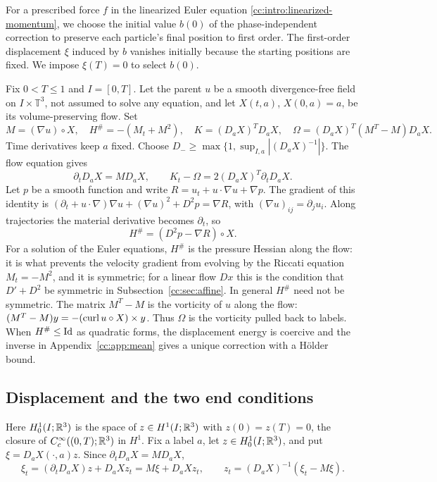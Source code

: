 For a prescribed force $f$ in the linearized Euler equation
\eqref{cc:intro:linearized-momentum}, we choose the initial value $b(0)$
of the phase-independent correction to preserve each particle's final
position to first order. The first-order displacement $\xi$ induced by
$b$ vanishes initially because the starting positions are fixed.
We impose $\xi(T)=0$ to select $b(0)$.

Fix $0<T\le1$ and $I=[0,T]$. Let the parent $u$ be a smooth
divergence-free field on $I\times\mathbb T^3$, not assumed to solve any
equation, and let $X(t,a)$, $X(0,a)=a$, be its volume-preserving flow. Set
\begin{equation}\label{cc:uf:mean:data}
 M=(\nabla u)\circ X,\quad
 H^\#=-(M_t+M^2),\quad
 K=(D_aX)^TD_aX,\quad \Omega=(D_aX)^T(M^T-M)D_aX.
\end{equation}
Time derivatives keep $a$ fixed. Choose
$D_-\ge\max\{1,\sup_{I,a}|(D_aX)^{-1}|\}$.
The flow equation gives
\begin{equation}\label{cc:uf:mean:flow-identities}
 \partial_t D_aX=MD_aX,\qquad
 K_t-\Omega=2(D_aX)^T\partial_t D_aX.
\end{equation}
Let $p$ be a smooth function and write $R=u_t+u\cdot\nabla u+\nabla p$.
The gradient of this identity is
$(\partial_t+u\cdot\nabla)\nabla u+(\nabla u)^2+D^2p=\nabla R$, with
$(\nabla u)_{ij}=\partial_ju_i$. Along trajectories the material
derivative becomes $\partial_t$, so
\begin{equation}\label{cc:uf:mean:eq:Hsharp}
 H^\#=(D^2p-\nabla R)\circ X.
\end{equation}
For a solution of the Euler equations, $H^\#$ is the pressure Hessian
along the flow: it is what prevents the velocity gradient from evolving
by the Riccati equation $M_t=-M^2$, and it is symmetric; for a linear
flow $Dx$ this is the condition that $D'+D^2$ be symmetric in
Subsection~\ref{cc:sec:affine}. In general $H^\#$ need not be symmetric.
The matrix $M^T-M$ is the vorticity of $u$ along the flow:
$(M^T-M)y=-(\operatorname{curl} u\circ X)\times y$. Thus $\Omega$ is the vorticity
pulled back to labels. When $H^\#\le\operatorname{Id}$ as quadratic forms, the
displacement energy is coercive and the inverse in Appendix~\ref{cc:app:mean}
gives a unique correction with a H\"older bound.

\subsection{Displacement and the two end conditions}

Here $H^1_0(I;\mathbb R^3)$ is the space of $z\in H^1(I;\mathbb R^3)$ with
$z(0)=z(T)=0$, the closure of $C^\infty_c((0,T);\mathbb R^3)$ in $H^1$. Fix a
label $a$, let $z\in H^1_0(I;\mathbb R^3)$, and put $\xi=D_aX(\cdot,a)z$. Since
$\partial_t D_aX=MD_aX$,
\begin{equation}\label{cc:uf:mean:xi-t}
 \xi_t=(\partial_t D_aX)z+D_aX z_t=M\xi+D_aX z_t,\qquad
 z_t=(D_aX)^{-1}(\xi_t-M\xi).
\end{equation}

